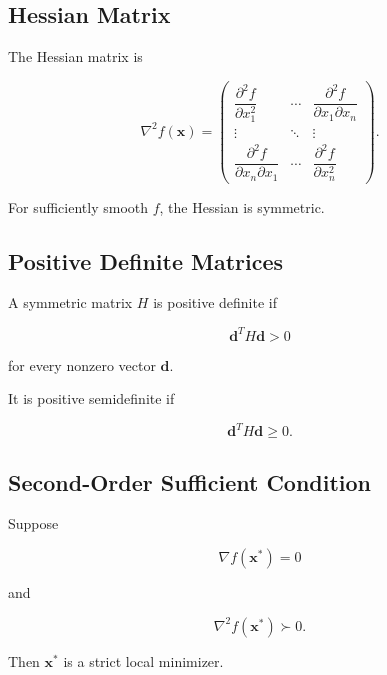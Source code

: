 \subsection{Hessian Matrix}
\label{subsec:hessian-optimization}

The Hessian matrix is

\[
\boxed{
\nabla^2f(\mathbf{x})
=
\begin{pmatrix}
\dfrac{\partial^2f}{\partial x_1^2}
&
\cdots
&
\dfrac{\partial^2f}{\partial x_1\partial x_n}
\\
\vdots
&
\ddots
&
\vdots
\\
\dfrac{\partial^2f}{\partial x_n\partial x_1}
&
\cdots
&
\dfrac{\partial^2f}{\partial x_n^2}
\end{pmatrix}.
}
\]

For sufficiently smooth \(f\), the Hessian is symmetric.

\subsection{Positive Definite Matrices}
\label{subsec:positive-definite-optimization}

A symmetric matrix \(H\) is positive definite if

\[
\boxed{
\mathbf{d}^TH\mathbf{d}>0
}
\]

for every nonzero vector \(\mathbf{d}\).

It is positive semidefinite if

\[
\boxed{
\mathbf{d}^TH\mathbf{d}\geq0.
}
\]

\subsection{Second-Order Sufficient Condition}
\label{subsec:second-order-sufficient-condition}

Suppose

\[
\nabla f(\mathbf{x}^*)=0
\]

and

\[
\boxed{
\nabla^2f(\mathbf{x}^*)
\succ0.
}
\]

Then \(\mathbf{x}^*\) is a strict local minimizer.


